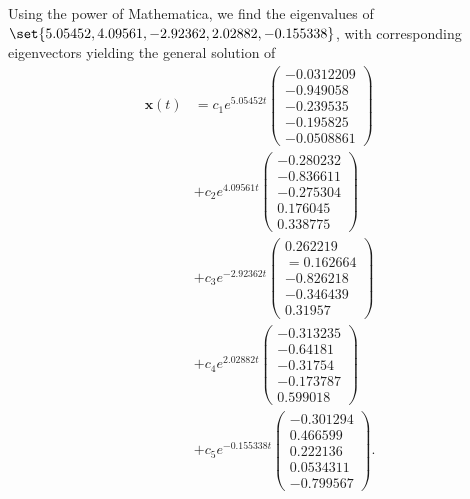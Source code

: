 \documentclass[10pt]{mypackage}
\begin{document}
\begin{solution}[8.2, Problem 16]
  Using the power of Mathematica, we find the eigenvalues of $\set{5.05452, 4.09561, -2.92362, 2.02882, -0.155338}$, with corresponding eigenvectors yielding the general solution of
  \begin{align*}
    \mathbf{x}(t) &= c_1e^{5.05452 t} \begin{pmatrix}-0.0312209\\-0.949058\\-0.239535\\-0.195825\\-0.0508861\end{pmatrix}\\
                  &+ c_2e^{4.09561 t} \begin{pmatrix}-0.280232\\-0.836611\\-0.275304\\0.176045\\0.338775\end{pmatrix}\\
                  &+ c_3e^{-2.92362 t} \begin{pmatrix}0.262219\\=0.162664\\-0.826218\\-0.346439\\0.31957\end{pmatrix}\\
                  &+ c_4e^{2.02882 t} \begin{pmatrix}-0.313235\\-0.64181\\-0.31754\\-0.173787\\0.599018\end{pmatrix} \\
                  &+ c_5e^{-0.155338 t} \begin{pmatrix}-0.301294\\0.466599\\0.222136\\0.0534311\\-0.799567\end{pmatrix}.
  \end{align*}
\end{solution}
\end{document}
